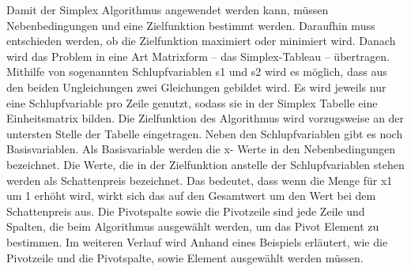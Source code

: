 Damit der Simplex Algorithmus angewendet werden kann, müssen Nebenbedingungen und eine Zielfunktion bestimmt werden. Daraufhin muss entschieden werden, ob die Zielfunktion maximiert oder minimiert wird. Danach wird das Problem in eine Art Matrixform – das Simplex-Tableau – übertragen. Mithilfe von sogenannten Schlupfvariablen s1 und s2 wird es möglich, dass aus den beiden Ungleichungen zwei Gleichungen gebildet wird. Es wird jeweils nur eine Schlupfvariable pro Zeile genutzt, sodass sie in der Simplex Tabelle eine Einheitsmatrix bilden. Die Zielfunktion des Algorithmus wird vorzugsweise an der untersten Stelle der Tabelle eingetragen. Neben den Schlupfvariablen gibt es noch Basisvariablen. Als Basisvariable werden die x- Werte in den Nebenbedingungen bezeichnet. Die Werte, die in der Zielfunktion anstelle der Schlupfvariablen stehen werden als Schattenpreis bezeichnet. Das bedeutet, dass wenn die Menge für x1 um 1 erhöht wird, wirkt sich das auf den Gesamtwert um den Wert bei dem Schattenpreis aus. Die Pivotspalte sowie die Pivotzeile sind jede Zeile und Spalten, die beim Algorithmus ausgewählt werden, um das Pivot Element zu bestimmen. Im weiteren Verlauf wird Anhand eines Beispiels erläutert, wie die Pivotzeile und die Pivotspalte, sowie Element ausgewählt werden müssen.





